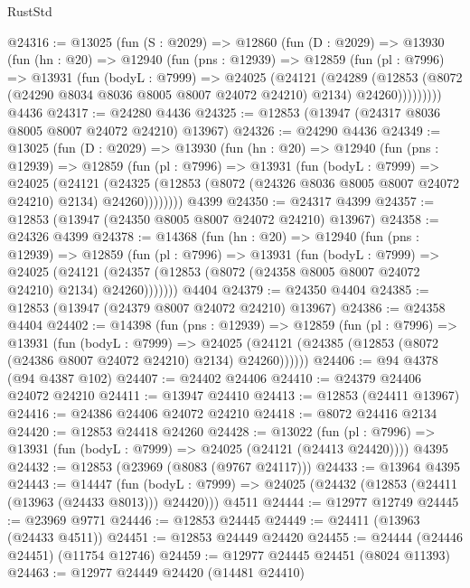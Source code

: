 \begin{lexlean}{RustStd}
\begin{coremodule}
@24316 := @13025
    (fun (S : @2029) =>
    @12860
      (fun (D : @2029) =>
      @13930
        (fun (hn : @20) =>
        @12940
          (fun (pns : @12939) =>
          @12859
            (fun (pl : @7996) =>
            @13931
              (fun (bodyL : @7999) =>
              @24025
                (@24121
                  (@24289
                    (@12853
                      (@8072 (@24290 @8034 @8036 @8005 @8007 @24072 @24210) @2134)
                      @24260)))))))))
    @4436
@24317 := @24280 @4436
@24325 := @12853 (@13947 (@24317 @8036 @8005 @8007 @24072 @24210) @13967)
@24326 := @24290 @4436
@24349 := @13025
    (fun (D : @2029) =>
    @13930
      (fun (hn : @20) =>
      @12940
        (fun (pns : @12939) =>
        @12859
          (fun (pl : @7996) =>
          @13931
            (fun (bodyL : @7999) =>
            @24025
              (@24121
                (@24325
                  (@12853 (@8072 (@24326 @8036 @8005 @8007 @24072 @24210) @2134) @24260))))))))
    @4399
@24350 := @24317 @4399
@24357 := @12853 (@13947 (@24350 @8005 @8007 @24072 @24210) @13967)
@24358 := @24326 @4399
@24378 := @14368
    (fun (hn : @20) =>
    @12940
      (fun (pns : @12939) =>
      @12859
        (fun (pl : @7996) =>
        @13931
          (fun (bodyL : @7999) =>
          @24025
            (@24121 (@24357 (@12853 (@8072 (@24358 @8005 @8007 @24072 @24210) @2134) @24260)))))))
    @4404
@24379 := @24350 @4404
@24385 := @12853 (@13947 (@24379 @8007 @24072 @24210) @13967)
@24386 := @24358 @4404
@24402 := @14398
    (fun (pns : @12939) =>
    @12859
      (fun (pl : @7996) =>
      @13931
        (fun (bodyL : @7999) =>
        @24025 (@24121 (@24385 (@12853 (@8072 (@24386 @8007 @24072 @24210) @2134) @24260))))))
@24406 := @94 @4378 (@94 @4387 @102)
@24407 := @24402 @24406
@24410 := @24379 @24406 @24072 @24210
@24411 := @13947 @24410
@24413 := @12853 (@24411 @13967)
@24416 := @24386 @24406 @24072 @24210
@24418 := @8072 @24416 @2134
@24420 := @12853 @24418 @24260
@24428 := @13022
    (fun (pl : @7996) => @13931 (fun (bodyL : @7999) => @24025 (@24121 (@24413 @24420))))
    @4395
@24432 := @12853 (@23969 (@8083 (@9767 @24117)))
@24433 := @13964 @4395
@24443 := @14447
    (fun (bodyL : @7999) => @24025 (@24432 (@12853 (@24411 (@13963 (@24433 @8013))) @24420)))
    @4511
@24444 := @12977 @12749
@24445 := @23969 @9771
@24446 := @12853 @24445
@24449 := @24411 (@13963 (@24433 @4511))
@24451 := @12853 @24449 @24420
@24455 := @24444 (@24446 @24451) (@11754 @12746)
@24459 := @12977 @24445 @24451 (@8024 @11393)
@24463 := @12977 @24449 @24420 (@14481 @24410)

\end{coremodule}
\end{lexlean}
